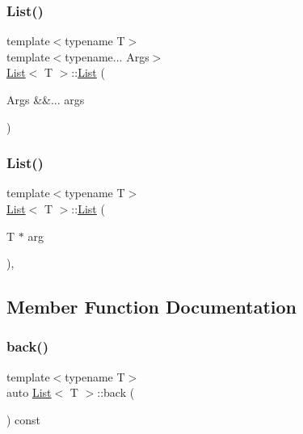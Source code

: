 \subsubsection{\texorpdfstring{List()}{List()}\hspace{0.1cm}{\footnotesize\ttfamily [1/2]}}
{\footnotesize\ttfamily template$<$typename T$>$ \\
template$<$typename... Args$>$ \\
\hyperlink{struct_list}{List}$<$ T $>$\+::\hyperlink{struct_list}{List} (\begin{DoxyParamCaption}\item[{Args \&\&...}]{args }\end{DoxyParamCaption})\hspace{0.3cm}{\ttfamily [inline]}}

\mbox{\label{struct_list_ac1fba3a80d1d7fffbd2c1853a624f40a}} 
\subsubsection{\texorpdfstring{List()}{List()}\hspace{0.1cm}{\footnotesize\ttfamily [2/2]}}
{\footnotesize\ttfamily template$<$typename T$>$ \\
\hyperlink{struct_list}{List}$<$ T $>$\+::\hyperlink{struct_list}{List} (\begin{DoxyParamCaption}\item[{T $\ast$}]{arg }\end{DoxyParamCaption})\hspace{0.3cm}{\ttfamily [inline]}, {\ttfamily [explicit]}}



\subsection{Member Function Documentation}
\mbox{\label{struct_list_a6949268f152305afc5bac0ee3e5bb838}} 
\subsubsection{\texorpdfstring{back()}{back()}}
{\footnotesize\ttfamily template$<$typename T$>$ \\
auto \hyperlink{struct_list}{List}$<$ T $>$\+::back (\begin{DoxyParamCaption}{ }\end{DoxyParamCaption}) const\hspace{0.3cm}{\ttfamily [inline]}}

